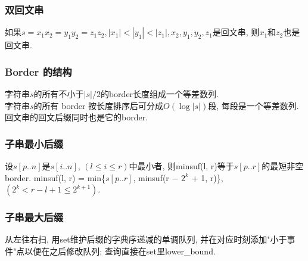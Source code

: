\subsubsection{双回文串}
\noindent
如果$s=x_1x_2=y_1y_2=z_1z_2, |x_1|<|y_1|<|z_1|, x_2, y_1, y_2, z_1$是回文串, 则$x_1$和$z_2$也是回文串. 

\subsubsection{Border 的结构}
\noindent
字符串$s$的所有不小于$|s|/2$的border长度组成一个等差数列.\\
字符串$s$的所有 border 按长度排序后可分成$O(\log{|s|})$段, 每段是一个等差数列. 回文串的回文后缀同时也是它的border. 

\subsubsection{子串最小后缀}
\noindent
设$s[p..n]$是$s[i..n]$, $(l \leq i \leq r)$中最小者, 则minsuf(l, r)等于$s[p..r]$的最短非空 border. minsuf(l, r) = min\{$s[p..r]$, minsuf(r − $2^k$ + 1, r)\}, $(2^k < r − l + 1 \leq 2^{k+1})$. 

\subsubsection{子串最大后缀}
\noindent
从左往右扫, 用set维护后缀的字典序递减的单调队列, 并在对应时刻添加"小于事件"点以便在之后修改队列; 查询直接在set里lower\_bound.

